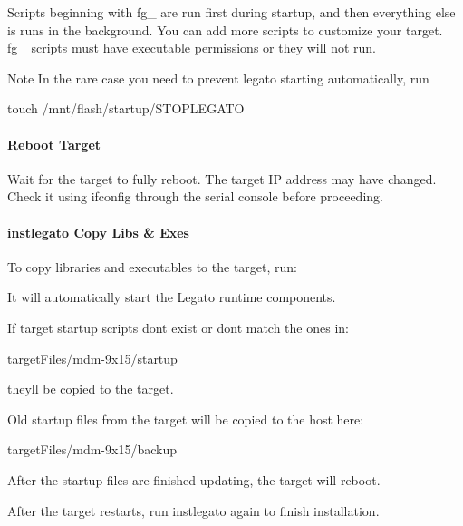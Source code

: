 Scripts beginning with {\ttfamily fg\+\_\+} are run first during startup, and then everything else is runs in the background. You can add more scripts to customize your target. {\ttfamily fg\+\_\+} scripts must have executable permissions or they will not run.

\begin{DoxyNote}{Note}
In the rare case you need to prevent legato starting automatically, run 
\begin{DoxyCode}
touch /mnt/flash/startup/STOPLEGATO 
\end{DoxyCode}

\end{DoxyNote}
\hypertarget{getstarted_target_s_w_getstartedTargetSetup_rebootTarget}{}\paragraph{Reboot Target}\label{getstarted_target_s_w_getstartedTargetSetup_rebootTarget}
Wait for the target to fully reboot. The target I\+P address may have changed. Check it using {\ttfamily ifconfig} through the serial console before proceeding.\hypertarget{getstarted_target_s_w_getstartedTargetSetup_copyLibExe}{}\paragraph{instlegato Copy Libs \& Exes}\label{getstarted_target_s_w_getstartedTargetSetup_copyLibExe}
To copy libraries and executables to the target, run\+:




It will automatically start the Legato runtime components.

If target startup scripts don\textquotesingle{}t exist or don\textquotesingle{}t match the ones in\+: 
\begin{DoxyCode}
targetFiles/mdm-9x15/startup 
\end{DoxyCode}
 they\textquotesingle{}ll be copied to the target.

Old startup files from the target will be copied to the host here\+: 
\begin{DoxyCode}
targetFiles/mdm-9x15/backup 
\end{DoxyCode}


After the startup files are finished updating, the target will reboot.

After the target restarts, run {\ttfamily instlegato} again to finish installation.

